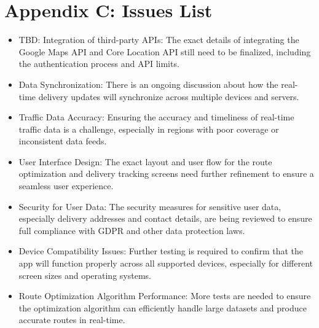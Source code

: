 \section{Appendix C: Issues List}
\begin{itemize}
    \item TBD: Integration of third-party APIs: The exact details of integrating the Google Maps API and Core Location API still need to be finalized, including the authentication process and API limits.
    \item Data Synchronization: There is an ongoing discussion about how the real-time delivery updates will synchronize across multiple devices and servers.
    \item Traffic Data Accuracy: Ensuring the accuracy and timeliness of real-time traffic data is a challenge, especially in regions with poor coverage or inconsistent data feeds.
    \item User Interface Design: The exact layout and user flow for the route optimization and delivery tracking screens need further refinement to ensure a seamless user experience.
    \item Security for User Data: The security measures for sensitive user data, especially delivery addresses and contact details, are being reviewed to ensure full compliance with GDPR and other data protection laws.
    \item Device Compatibility Issues: Further testing is required to confirm that the app will function properly across all supported devices, especially for different screen sizes and operating systems.
    \item Route Optimization Algorithm Performance: More tests are needed to ensure the optimization algorithm can efficiently handle large datasets and produce accurate routes in real-time.
\end{itemize}
